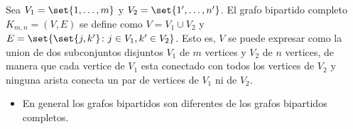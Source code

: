 \begin{definition}
	Sea \(V_1 = \set{1,\ldots,m }\) y \(V_2 = \set{1^\prime,\ldots,n^\prime }\). El grafo bipartido completo \(K_{m,n} = (V,E )\) se define como \(V = V_1 \cup V_2 \) y \(E = \set{\set{j,k^\prime } \colon j \in V_1, k^\prime \in V_2 }\). Esto es, \(V \) se puede expresar como la union de dos subconjuntos disjuntos \(V_1 \) de \(m \) vertices y \(V_2 \) de \(n \) vertices, de manera que cada vertice de \(V_1 \) esta conectado con todos los vertices de \(V_2 \) y ninguna arista conecta un par de vertices de \(V_1 \) ni de \(V_2\).
\end{definition}
\begin{center}
\end{center}

\begin{itemize}
	\item En general los grafos bipartidos son diferentes de los grafos bipartidos completos.
\end{itemize}

